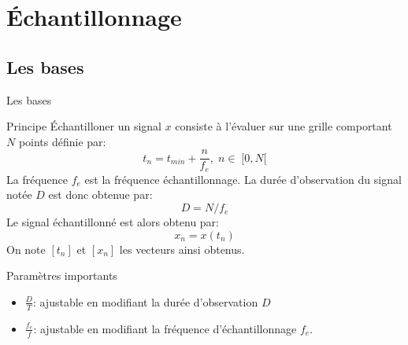 \documentclass[8pt,a4paper]{beamer}
\begin{document}
\section{Échantillonnage}
  \subsection{Les bases}
  \begin{frame}{Les bases}
  \begin{block}{Principe}
  \'Echantilloner un signal $x$ consiste à l'évaluer sur une grille comportant $N$ points définie par:
  $$
  t_n = t_{min}+\frac{n}{f_e}, \; n \in \; [0,N[
  $$
  La fréquence $f_e$ est la fréquence échantillonnage. La durée d'observation du signal notée $D$ est donc obtenue par:
  $$
  D = N/f_e
  $$
  Le signal échantillonné est alors obtenu par:
  $$
  x_n=x(t_n)
  $$
  On note $[t_n]$ et $[x_n]$ les vecteurs ainsi obtenus.
  \end{block}
  \begin{block}{Paramètres importants}  
  \begin{itemize}
  \item $\frac{D}{T}$: ajustable en modifiant la durée d'observation $D$
  \item $\frac{f_e}{f}$: ajustable en modifiant la fréquence d’échantillonnage $f_e$.
  \end{itemize}
  \end{block}
  \end{frame}
  
\end{document}
